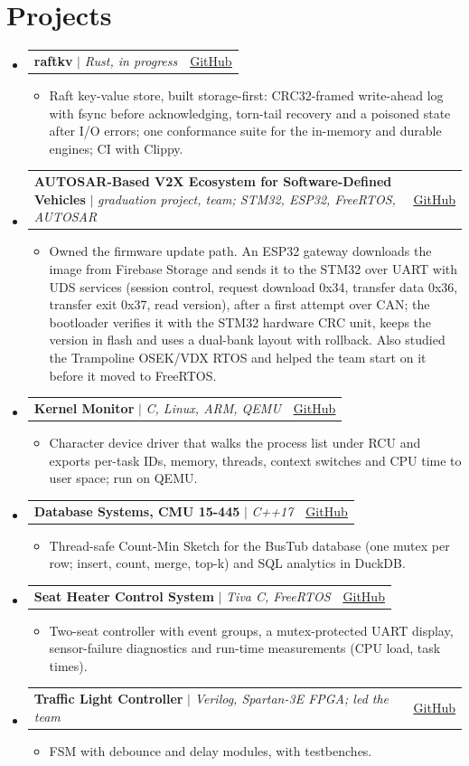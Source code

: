 \documentclass[letterpaper,11pt]{article}
\makeatletter
\newcommand{\resumeItem}[1]{
  \item\small{
    {#1 \vspace{-2pt}}
  }
}
\newcommand{\resumeProjectHeading}[2]{
    \item
    \begin{tabular*}{0.97\textwidth}{l@{\extracolsep{\fill}}r}
      \small#1 & #2 \\
    \end{tabular*}\vspace{-7pt}
}
\newcommand{\resumeSubHeadingListStart}{\begin{itemize}[leftmargin=0.15in, label={}]}
\newcommand{\resumeSubHeadingListEnd}{\end{itemize}}
\newcommand{\resumeItemListStart}{\begin{itemize}}
\newcommand{\resumeItemListEnd}{\end{itemize}\vspace{-5pt}}
\newcommand{\cvlink}[2]{\href{#1}{\underline{#2}}}
\makeatother
\begin{document}
\section{Projects}
    \resumeSubHeadingListStart
      \resumeProjectHeading
          {\textbf{raftkv} $|$ \emph{Rust, in progress}}{\cvlink{https://github.com/Abd002/raftkv}{GitHub}}
          \resumeItemListStart
            \resumeItem{Raft key-value store, built storage-first: CRC32-framed write-ahead log with fsync before acknowledging, torn-tail recovery and a poisoned state after I/O errors; one conformance suite for the in-memory and durable engines; CI with Clippy.}
          \resumeItemListEnd
      \resumeProjectHeading
          {\textbf{AUTOSAR-Based V2X Ecosystem for Software-Defined Vehicles} $|$ \emph{graduation project, team; STM32, ESP32, FreeRTOS, AUTOSAR}}{\cvlink{https://github.com/Abd002/Graduation-Project}{GitHub}}
          \resumeItemListStart
            \resumeItem{Owned the firmware update path. An ESP32 gateway downloads the image from Firebase Storage and sends it to the STM32 over UART with UDS services (session control, request download 0x34, transfer data 0x36, transfer exit 0x37, read version), after a first attempt over CAN; the bootloader verifies it with the STM32 hardware CRC unit, keeps the version in flash and uses a dual-bank layout with rollback. Also studied the Trampoline OSEK/VDX RTOS and helped the team start on it before it moved to FreeRTOS.}
          \resumeItemListEnd
      \resumeProjectHeading
          {\textbf{Kernel Monitor} $|$ \emph{C, Linux, ARM, QEMU}}{\cvlink{https://github.com/Abd002/kernel-monitor}{GitHub}}
          \resumeItemListStart
            \resumeItem{Character device driver that walks the process list under RCU and exports per-task IDs, memory, threads, context switches and CPU time to user space; run on QEMU.}
          \resumeItemListEnd
      \resumeProjectHeading
          {\textbf{Database Systems, CMU 15-445} $|$ \emph{C++17}}{\cvlink{https://github.com/Abd002/db-systems-journey}{GitHub}}
          \resumeItemListStart
            \resumeItem{Thread-safe Count-Min Sketch for the BusTub database (one mutex per row; insert, count, merge, top-k) and SQL analytics in DuckDB.}
          \resumeItemListEnd
      \resumeProjectHeading
          {\textbf{Seat Heater Control System} $|$ \emph{Tiva C, FreeRTOS}}{\cvlink{https://github.com/Abd002/SeatHeaterControlSystem}{GitHub}}
          \resumeItemListStart
            \resumeItem{Two-seat controller with event groups, a mutex-protected UART display, sensor-failure diagnostics and run-time measurements (CPU load, task times).}
          \resumeItemListEnd
      \resumeProjectHeading
          {\textbf{Traffic Light Controller} $|$ \emph{Verilog, Spartan-3E FPGA; led the team}}{\cvlink{https://github.com/Abd002/Traffic-Light-Controller}{GitHub}}
          \resumeItemListStart
            \resumeItem{FSM with debounce and delay modules, with testbenches.}
          \resumeItemListEnd
    \resumeSubHeadingListEnd
\end{document}
